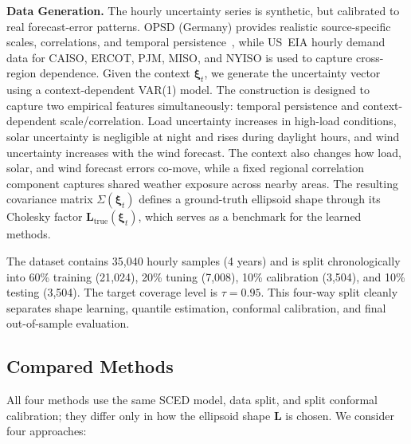 \documentclass[11pt]{article}
\newcommand{\bxi}{\bm{\xi}}
\newcommand{\bL}{\bm{L}}
\theoremstyle{definition}
\begin{document}
\textbf{Data Generation.} The hourly uncertainty series is synthetic, but calibrated to real forecast-error patterns. OPSD (Germany) provides realistic source-specific scales, correlations, and temporal persistence~\citep{opsd2020}, while US~EIA hourly demand data for CAISO, ERCOT, PJM, MISO, and NYISO is used to capture cross-region dependence. Given the context $\bxi_t$, we generate the uncertainty vector using a context-dependent VAR(1) model. The construction is designed to capture two empirical features simultaneously: temporal persistence and context-dependent scale/correlation. Load uncertainty increases in high-load conditions, solar uncertainty is negligible at night and rises during daylight hours, and wind uncertainty increases with the wind forecast. The context also changes how load, solar, and wind forecast errors co-move, while a fixed regional correlation component captures shared weather exposure across nearby areas. The resulting covariance matrix $\Sigma(\bxi_t)$ defines a ground-truth ellipsoid shape through its Cholesky factor $\bL_{\mathrm{true}}(\bxi_t)$, which serves as a benchmark for the learned methods.

The dataset contains 35{,}040 hourly samples (4 years) and is split chronologically into 60\% training (21{,}024), 20\% tuning (7{,}008), 10\% calibration (3{,}504), and 10\% testing (3{,}504). The target coverage level is $\tau=0.95$. This four-way split cleanly separates shape learning, quantile estimation, conformal calibration, and final out-of-sample evaluation.

\subsection{Compared Methods}

All four methods use the same SCED model, data split, and split conformal calibration; they differ only in how the ellipsoid shape $\bL$ is chosen. We consider four approaches:
\end{document}
